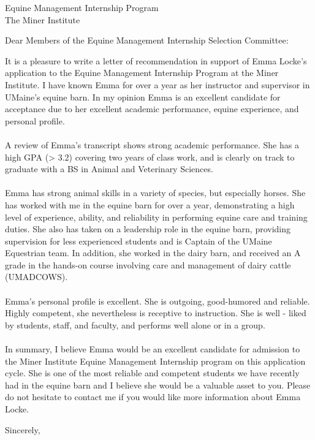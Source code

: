 \documentclass[a4paper,11pt]{letter}
\begin{document}
\begin{letter}{Equine Management Internship Program\\The Miner Institute}
\opening{Dear Members of the Equine Management Internship Selection Committee:} %
It is a pleasure to write a letter of recommendation in support of Emma Locke's application to the Equine Management Internship Program at the Miner Institute. I have known Emma for over a year as her instructor and supervisor in UMaine's equine barn. In my opinion Emma is an excellent candidate for acceptance due to her excellent academic performance, equine experience, and personal profile.\\~\\
A review of Emma's transcript shows strong academic performance. She has a high GPA (> 3.2) covering two years of class work, and is clearly on track to graduate with a BS in Animal and Veterinary Sciences. \\~\\
Emma has strong animal skills in a variety of species, but especially horses. She has worked with me in the equine barn for over a year, demonstrating a high level of experience, ability, and reliability in performing equine care and training duties.  She also has taken on a leadership role in the equine barn, providing supervision for less experienced students and is Captain of the UMaine Equestrian team. In addition, she worked in the dairy barn, and received an A grade in the hands-on course involving care and management of dairy cattle (UMADCOWS). \\~\\
Emma's personal profile is excellent. She is outgoing, good-humored and reliable. Highly competent, she nevertheless is receptive to instruction. She is well - liked by students, staff, and faculty, and performs well alone or in a group. \\~\\
In summary, I believe Emma would be an excellent candidate for admission to the Miner Institute Equine Management Internship program on this application cycle. She is one of the most reliable and competent students we have recently had in the equine barn and I believe she would be a valuable asset to you. Please do not hesitate to contact me if you would like more information about Emma Locke.
\closing{\hspace{-5em}Sincerely,}
~\\~\\
\end{letter}
\end{document}
